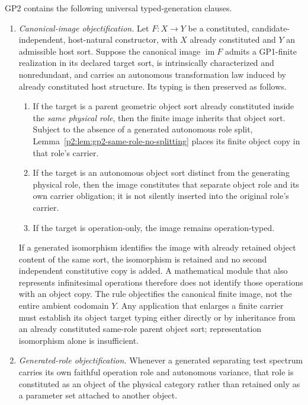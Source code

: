 \documentclass[12pt,a4paper]{article}
\begin{document}
\begin{mdframed}[style=postulatebox,nobreak=false]
\begin{postulate}
GP2 contains the following universal typed-generation clauses.
\begin{enumerate}[label=(\alph*),leftmargin=2em]
\item \emph{Canonical-image objectification.}  Let \(F:X\to Y\) be a
constituted, candidate-independent, host-natural constructor, with \(X\)
already constituted and \(Y\) an admissible host sort.  Suppose the canonical
image \(\operatorname{im}F\) admits a GP1-finite realization in its declared
target sort, is intrinsically characterized and nonredundant, and carries an
autonomous transformation law induced by already constituted host structure.
Its typing is then preserved as follows.
\begin{enumerate}[label=(\alph*),leftmargin=2em]
\item If the target is a parent geometric object sort already constituted
inside the \emph{same physical role}, then the finite image inherits that
object sort.  Subject to the absence of a generated autonomous role split,
Lemma~\ref{p2:lem:gp2-same-role-no-splitting} places its finite object copy in
that role's carrier.
\item If the target is an autonomous object sort distinct from the generating
physical role, then the image constitutes that separate object role and its
own carrier obligation; it is not silently inserted into the original role's
carrier.
\item If the target is operation-only, the image remains operation-typed.
\end{enumerate}
If a generated isomorphism identifies the image with already retained object
content of the same sort, the isomorphism is retained and no second independent
constitutive copy is added.  A mathematical module that also represents
infinitesimal operations therefore does not identify those operations with an
object copy.  The rule objectifies the canonical finite image, not the entire
ambient codomain \(Y\).  Any application that enlarges a finite carrier must
establish its object target typing either directly or by inheritance from an
already constituted same-role parent object sort; representation isomorphism
alone is insufficient.

\item \emph{Generated-role objectification.}  Whenever a generated separating
test spectrum carries its own faithful operation role and autonomous variance,
that role is constituted as an object of the physical category rather than
retained only as a parameter set attached to another object.


\end{enumerate}
\end{postulate}
\end{mdframed}
\end{document}
